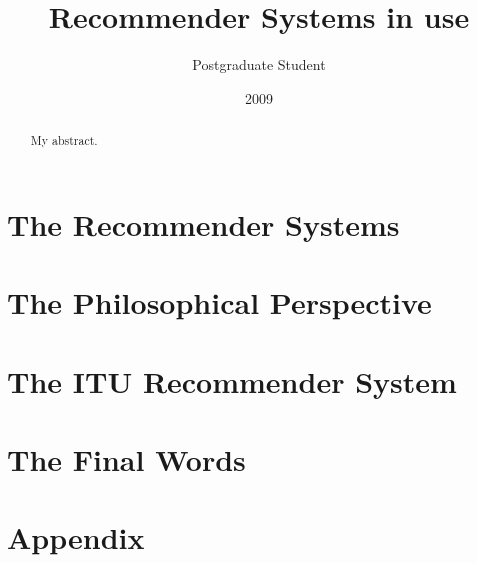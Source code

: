 \documentclass[10pt, oneside]{report}
\title{Recommender Systems in use}
\author{Postgraduate Student}
\date{2009}
\begin{document}
\newcommand\todo[1]{\textcolor{red}{#1}\PackageWarning{TODO:}{#1!}}

\maketitle


\begin{abstract}
My abstract.
\end{abstract}

\tableofcontents

\chapter{The Recommender Systems}
\label{chap:chapter1}





\chapter{The Philosophical Perspective}
\label{chap:chapter2}


\chapter{The ITU Recommender System}
\label{chap:chapter3}






\chapter{The Final Words} %
\label{cha:the_final_words}



\chapter{Appendix}

\end{document}
